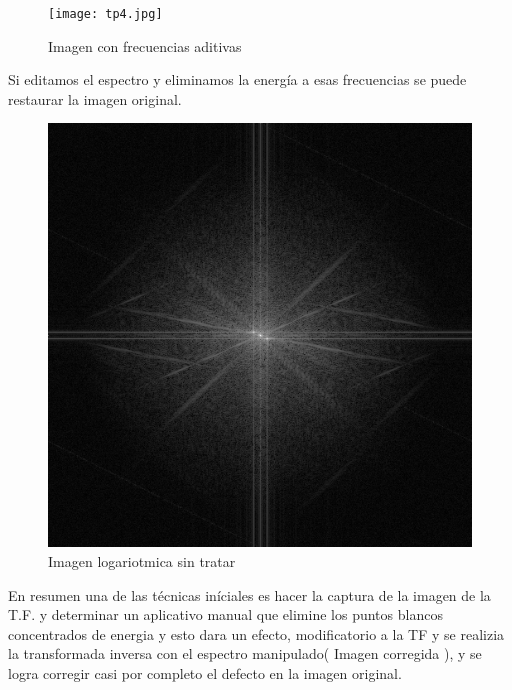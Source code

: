 \documentclass[Spanish,12pt,doublespace,german,letterpaper]{article}
\begin{document}
\begin{figure}[h]
\begin{center}
\texttt{[image: tp4.jpg]}
\caption{Imagen con frecuencias aditivas}
\label{default}
\end{center}
\end{figure}
Si editamos el espectro y eliminamos la energía a esas frecuencias se puede restaurar la imagen original.
\begin{figure}[h]
\begin{center}
\includegraphics[scale=0.4]{log_center_mag.png}
\caption{Imagen logariotmica sin tratar}
\label{Imagen logariotmica sin tratar}
\end{center}
\end{figure}
En resumen una de las técnicas iníciales es hacer la captura de la imagen de la T.F. y determinar un aplicativo manual que elimine los puntos blancos concentrados de energia y esto dara un efecto, modificatorio a  la TF y se realizia  la transformada inversa con el espectro manipulado( Imagen corregida ), y se logra corregir casi por completo el defecto en la imagen original.
\end{document}
